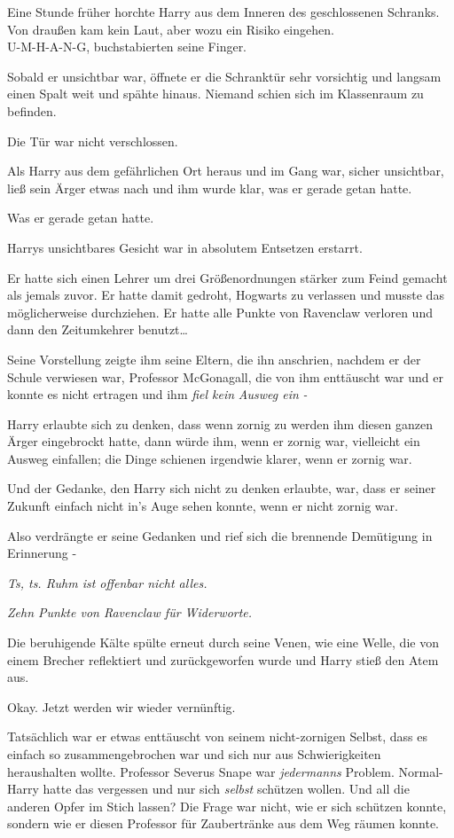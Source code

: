 {Eine Stunde früher horchte Harry aus dem Inneren des geschlossenen Schranks. Von draußen kam kein Laut, aber wozu ein Risiko eingehen.\\ U-M-H-A-N-G, buchstabierten seine Finger.

Sobald er unsichtbar war, öffnete er die Schranktür sehr vorsichtig und langsam einen Spalt weit und spähte hinaus. Niemand schien sich im Klassenraum zu befinden.

Die Tür war nicht verschlossen.

Als Harry aus dem gefährlichen Ort heraus und im Gang war, sicher unsichtbar, ließ sein Ärger etwas nach und ihm wurde klar, was er gerade getan hatte.

Was er gerade getan hatte.

Harrys unsichtbares Gesicht war in absolutem Entsetzen erstarrt.

Er hatte sich einen Lehrer um drei Größenordnungen stärker zum Feind gemacht als jemals zuvor. Er hatte damit gedroht, Hogwarts zu verlassen und musste das möglicherweise durchziehen. Er hatte alle Punkte von Ravenclaw verloren und dann den Zeitumkehrer benutzt…

Seine Vorstellung zeigte ihm seine Eltern, die ihn anschrien, nachdem er der Schule verwiesen war, Professor McGonagall, die von ihm enttäuscht war und er konnte es nicht ertragen und ihm \emph{fiel kein} \emph{Ausweg ein} \emph{-}

Harry erlaubte sich zu denken, dass wenn zornig zu werden ihm diesen ganzen Ärger eingebrockt hatte, dann würde ihm, wenn er zornig war, vielleicht ein Ausweg einfallen; die Dinge schienen irgendwie klarer, wenn er zornig war.

Und der Gedanke, den Harry sich nicht zu denken erlaubte, war, dass er seiner Zukunft einfach nicht in's Auge sehen konnte, wenn er nicht zornig war.

Also verdrängte er seine Gedanken und rief sich die brennende Demütigung in Erinnerung -

\emph{Ts, ts. Ruhm ist offenbar nicht alles.}

\emph{Zehn Punkte von Ravenclaw für Widerworte.}

Die beruhigende Kälte spülte erneut durch seine Venen, wie eine Welle, die von einem Brecher reflektiert und zurückgeworfen wurde und Harry stieß den Atem aus.

Okay. Jetzt werden wir wieder vernünftig.

Tatsächlich war er etwas enttäuscht von seinem nicht-zornigen Selbst, dass es einfach so zusammengebrochen war und sich nur aus Schwierigkeiten heraushalten wollte. Professor Severus Snape war \emph{jedermanns} Problem. Normal-Harry hatte das vergessen und nur sich \emph{selbst} schützen wollen. Und all die anderen Opfer im Stich lassen? Die Frage war nicht, wie er sich schützen konnte, sondern wie er diesen Professor für Zaubertränke aus dem Weg räumen konnte.

}
